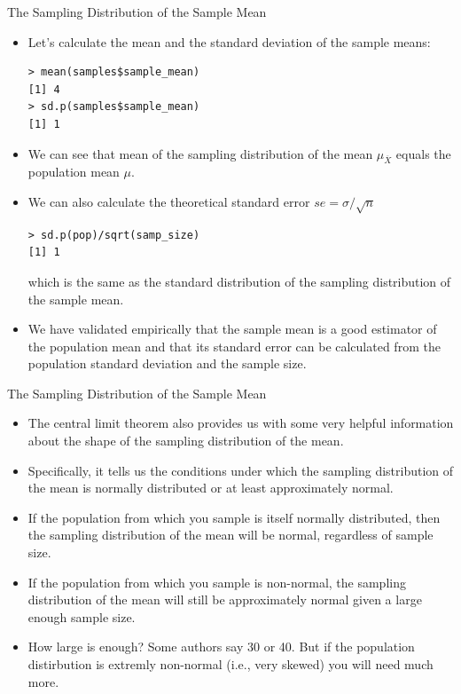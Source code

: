 \documentclass[handout]{beamer}
\begin{document}
\begin{frame}[fragile]{The Sampling Distribution of the Sample Mean}
\scriptsize{
\begin{itemize}
\item Let's calculate the mean and the standard deviation of the sample means:
\begin{verbatim}
> mean(samples$sample_mean)
[1] 4
> sd.p(samples$sample_mean)
[1] 1
\end{verbatim}

\item We can see that mean of the sampling distribution of the mean $\mu_{\overline{X}}$ equals the population mean $\mu$.


\item We can also calculate the theoretical standard error $se=\sigma/\sqrt{n}$

\begin{verbatim}
> sd.p(pop)/sqrt(samp_size)
[1] 1
\end{verbatim}

which is the same as the standard distribution of the sampling distribution of the sample mean.

\item We have validated empirically that the sample mean is a good estimator of the population mean and that its standard error can be calculated from the population standard deviation and the sample size.

\end{itemize}



} 
\end{frame}


\begin{frame}[fragile]{The Sampling Distribution of the Sample Mean}
\scriptsize{

\begin{itemize}
\item The central limit theorem also provides us with some very helpful information about the shape of the sampling distribution of the mean. 
\item Specifically, it tells us the conditions under which the
sampling distribution of the mean is normally distributed or at least approximately normal.
\item If the population from which you sample is itself normally distributed, then the sampling distribution of the mean will be normal, regardless of sample size.
\item If the population from which you sample is non-normal, the sampling distribution of the mean will still be approximately normal given a large enough sample size.
\item How large is enough? Some authors say 30 or 40. But if the population distirbution is extremly non-normal (i.e., very skewed) you will need much more.
\end{itemize}


} 
\end{frame}
\end{document}
